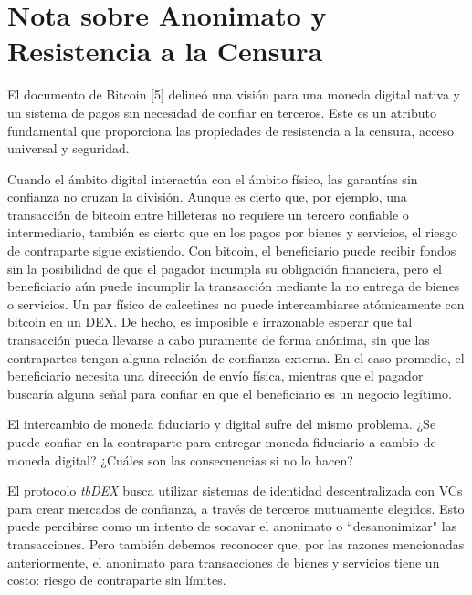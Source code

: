 \documentclass[11pt]{article}
\begin{document}
\vspace{1\baselineskip}
\section{Nota sobre Anonimato y Resistencia a la Censura}

\vspace{1\baselineskip}
El documento de Bitcoin [5] delineó una visión para una moneda digital nativa y un sistema de pagos sin necesidad de confiar en terceros. Este es un atributo fundamental que proporciona las propiedades de resistencia a la censura, acceso universal y seguridad.

\vspace{1\baselineskip}
Cuando el ámbito digital interactúa con el ámbito físico, las garantías sin confianza no cruzan la división. Aunque es cierto que, por ejemplo, una transacción de bitcoin entre billeteras no requiere un tercero confiable o intermediario, también es cierto que en los pagos por bienes y servicios, el riesgo de contraparte sigue existiendo. Con bitcoin, el beneficiario puede recibir fondos sin la posibilidad de que el pagador incumpla su obligación financiera, pero el beneficiario aún puede incumplir la transacción mediante la no entrega de bienes o servicios. Un par físico de calcetines no puede intercambiarse atómicamente con bitcoin en un DEX. De hecho, es imposible e irrazonable esperar que tal transacción pueda llevarse a cabo puramente de forma anónima, sin que las contrapartes tengan alguna relación de confianza externa. En el caso promedio, el beneficiario necesita una dirección de envío física, mientras que el pagador buscaría alguna señal para confiar en que el beneficiario es un negocio legítimo.

\vspace{1\baselineskip}
El intercambio de moneda fiduciario y digital sufre del mismo problema. ¿Se puede confiar en la contraparte para entregar moneda fiduciario a cambio de moneda digital? ¿Cuáles son las consecuencias si no lo hacen?

\vspace{1\baselineskip}
El protocolo \textit{tbDEX} busca utilizar sistemas de identidad descentralizada con VCs para crear mercados de confianza, a través de terceros mutuamente elegidos. Esto puede percibirse como un intento de socavar el anonimato o ``desanonimizar" las transacciones. Pero también debemos reconocer que, por las razones mencionadas anteriormente, el anonimato para transacciones de bienes y servicios tiene un costo: riesgo de contraparte sin límites.
\end{document}
